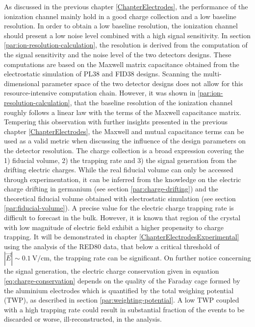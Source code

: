 As discussed in the previous chapter \ref{ChapterElectrodes}, the performance of the ionization channel mainly hold in a good charge collection and a low baseline resolution.
In order to obtain a low baseline resolution, the ionization channel should present a low noise level combined with a high signal sensitivity. In section \ref{par:ion-resolution-calculation}, the resolution is derived from the computation of the signal sensitivity and the noise level of the two detectors designs. These computations are based on the Maxwell matrix capacitance obtained from the electrostatic simulation of PL38 and FID38 designs. Scanning the multi-dimensional parameter space of the two detector designs does not allow for this resource-intensive computation chain. However, it was shown in \ref{par:ion-resolution-calculation}, that the baseline resolution of the ionization channel roughly follows a linear law with the terms of the Maxwell capacitance matrix. Tempering this observation with further insights presented in the previous chapter \ref{ChapterElectrodes}, the Maxwell and mutual capacitance terms can be used as a valid metric when discussing the influence of the design parameters on the detector resolution.
The charge collection is a broad expression covering the 1) fiducial volume, 2) the trapping rate and 3) the signal generation from the drifting electric charges. While the real fiducial volume can only be accessed through experimentation, it can be inferred from the knowledge on the electric charge drifting in germanium (see section \ref{par:charge-drifting}) and the theoretical fiducial volume obtained with electrostatic simulation (see section \ref{par:fiducial-volume}).
A precise value for the electric charge trapping rate is difficult to forecast in the bulk. However, it is known that region of the crystal with low magnitude of electric field exhibit a higher propensity to charge trapping. It will be demonstrated in chapter \ref{ChapterElectrodesExperimental} using the analysis of the RED80 data, that below a critical threshold of $|\vec{E}| \sim \SI{0.1}{\volt\per\centi\meter}$, the trapping rate can be significant. %
On further notice concerning the signal generation, the electric charge conservation given in equation \ref{eq:charge-conservation} depends on the quality of the Faraday cage formed by the aluminium electrodes which is quantified by the total weighing potential (TWP), as described in section \ref{par:weighting-potential}. A low TWP coupled with a high trapping rate could result in substantial fraction of the events to be discarded or worse, ill-reconstructed, in the analysis.

